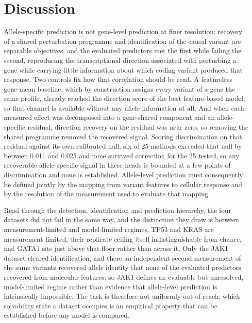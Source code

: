 \documentclass[11pt,letterpaper]{article}
\begin{document}
\section*{Discussion}

Allele-specific prediction is not gene-level prediction at finer resolution: recovery of a shared perturbation programme and identification of the causal variant are separable objectives, and the evaluated predictors met the first while failing the second, reproducing the transcriptional direction associated with perturbing a gene while carrying little information about which coding variant produced that response. Two controls fix how that correlation should be read. A featureless gene-mean baseline, which by construction assigns every variant of a gene the same profile, already reached the direction score of the best feature-based model, so that channel is available without any allele information at all. And when each measured effect was decomposed into a gene-shared component and an allele-specific residual, direction recovery on the residual was near zero, so removing the shared programme removed the recovered signal. Scoring discrimination on that residual against its own calibrated null, six of 25 methods exceeded that null by between 0.011 and 0.025 and none survived correction for the 25 tested, so any recoverable allele-specific signal in these heads is bounded at a few points of discrimination and none is established. Allele-level prediction must consequently be defined jointly by the mapping from variant features to cellular response and by the resolution of the measurement used to evaluate that mapping.

Read through the detection, identification and prediction hierarchy, the four datasets did not fail in the same way, and the distinction they draw is between measurement-limited and model-limited regimes. TP53 and KRAS are measurement-limited, their replicate ceiling itself indistinguishable from chance, and GATA1 sits just above that floor rather than across it. Only the JAK1 dataset cleared identification, and there an independent second measurement of the same variants recovered allele identity that none of the evaluated predictors recovered from molecular features, so JAK1 defines an evaluable but unresolved, model-limited regime rather than evidence that allele-level prediction is intrinsically impossible. The task is therefore not uniformly out of reach: which solvability state a dataset occupies is an empirical property that can be established before any model is compared.
\end{document}
